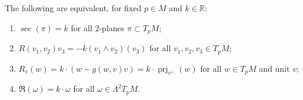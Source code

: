 \begin{proposition}[Riemann, 1854]
  \label{prop:pet-ch3-riemann-constant-curvature-equivalence}
  \leanok
  The following are equivalent, for fixed $p\in M$ and $k\in\mathbb R$:
  \begin{enumerate}
    \item[(1)] $\sec(\pi)=k$ for all $2$-planes $\pi\subset T_pM$;
    \item[(2)] $R(v_1,v_2)v_3=-k(v_1\wedge v_2)(v_3)$ for all $v_1,v_2,v_3\in T_pM$;
    \item[(3)] $R_v(w)=k\cdot(w-g(w,v)v)=k\cdot\operatorname{prj}_{v^\perp}(w)$ for all
    $w\in T_pM$ and unit $v$;
    \item[(4)] $\mathfrak R(\omega)=k\cdot\omega$ for all $\omega\in\Lambda^2T_pM$.
  \end{enumerate}
\end{proposition}
